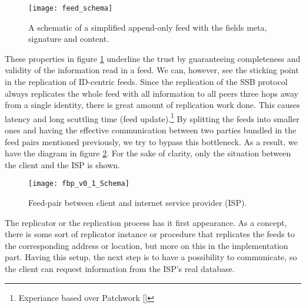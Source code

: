 \begin{figure}
    \centering
    \texttt{[image: feed\_schema]}
    \caption{A schematic of a simplified append-only feed with the fields meta, signature and content.}
    \label{fig:feed_schema}
\end{figure}

These properties in figure \ref{fig:feed_schema} underline the trust by guaranteeing completeness and validity of the information read in a feed. We can, however, see the sticking point in the replication of ID-centric feeds. Since the replication of the SSB protocol always replicates the whole feed with all information to all peers three hops away from a single identity, there is great amount of replication work done. This causes latency and long scuttling time (feed update).\footnote{Experiance based over Patchwork []} By splitting the feeds into smaller ones and having the effective communication between two parties bundled in the feed pairs mentioned previously, we try to bypass this bottleneck. As a result, we have the diagram in figure \ref{fig:contract_cli_isp}. For the sake of clarity, only the situation between the client and the ISP is shown. 

\begin{figure}
    \centering
    \texttt{[image: fbp\_v0\_1\_Schema]}
    \caption{Feed-pair between client and internet service provider (ISP).}
    \label{fig:contract_cli_isp}
\end{figure}
The replicator or the replication process has it first appearance. As a concept, there is some sort of replicator instance or procedure that replicates the feeds to the corresponding address or location, but more on this in the implementation part. Having this setup, the next step is to have a possibility to communicate, so the client can request information from the ISP’s real database.
\enlargethispage{\baselineskip}
\pagebreak

